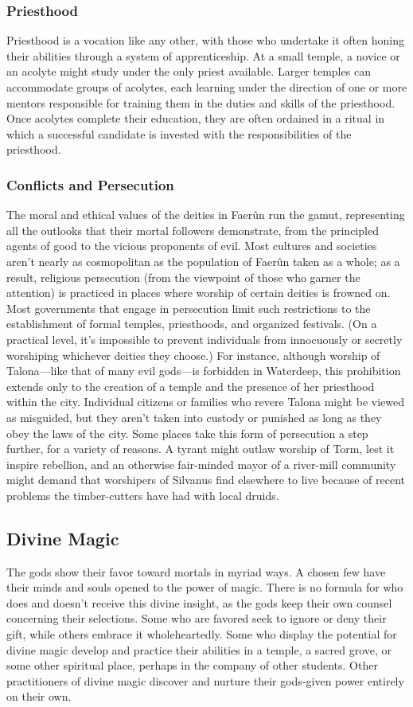 \documentclass[10pt,a4paper,twoside,twocolumn,openany,bg=print,nodeprecatedcode]{dndbook}
\begin{document}
\subsubsection{Priesthood}
Priesthood is a vocation like any other, with those who undertake it often honing their abilities through a system of apprenticeship. At a small temple, a novice or an acolyte might study under the only priest available. Larger temples can accommodate groups of acolytes, each learning under the direction of one or more mentors responsible for training them in the duties and skills of the priesthood.
Once acolytes complete their education, they are often ordained in a ritual in which a successful candidate is invested with the responsibilities of the priesthood.
\subsubsection{Conflicts and Persecution}
The moral and ethical values of the deities in Faerûn run the gamut, representing all the outlooks that their mortal followers demonstrate, from the principled agents of good to the vicious proponents of evil. Most cultures and societies aren't nearly as cosmopolitan as the population of Faerûn taken as a whole; as a result, religious persecution (from the viewpoint of those who garner the attention) is practiced in places where worship of certain deities is frowned on.
Most governments that engage in persecution limit such restrictions to the establishment of formal temples, priesthoods, and organized festivals. (On a practical level, it's impossible to prevent individuals from innocuously or secretly worshiping whichever deities they choose.) For instance, although worship of Talona—like that of many evil gods—is forbidden in Waterdeep, this prohibition extends only to the creation of a temple and the presence of her priesthood within the city. Individual citizens or families who revere Talona might be viewed as misguided, but they aren't taken into custody or punished as long as they obey the laws of the city.
Some places take this form of persecution a step further, for a variety of reasons. A tyrant might outlaw worship of Torm, lest it inspire rebellion, and an otherwise fair-minded mayor of a river-mill community might demand that worshipers of Silvanus find elsewhere to live because of recent problems the timber-cutters have had with local druids.
\subsection{Divine Magic}
The gods show their favor toward mortals in myriad ways. A chosen few have their minds and souls opened to the power of magic. There is no formula for who does and doesn't receive this divine insight, as the gods keep their own counsel concerning their selections. Some who are favored seek to ignore or deny their gift, while others embrace it wholeheartedly.
Some who display the potential for divine magic develop and practice their abilities in a temple, a sacred grove, or some other spiritual place, perhaps in the company of other students. Other practitioners of divine magic discover and nurture their gods-given power entirely on their own.
\end{document}
